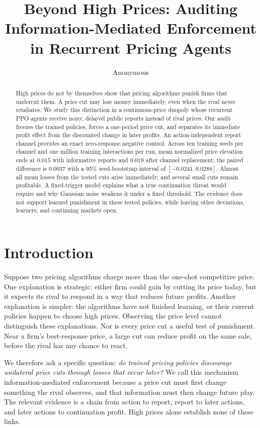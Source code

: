 \documentclass{article}
\title{Beyond High Prices: Auditing Information-Mediated Enforcement in Recurrent Pricing Agents}
\author{Anonymous}
\begin{document}
\maketitle

\begin{abstract}
High prices do not by themselves show that pricing algorithms punish firms that undercut them. A price cut may lose money immediately, even when the rival never retaliates. We study this distinction in a continuous-price duopoly whose recurrent PPO agents receive noisy, delayed public reports instead of rival prices. Our audit freezes the trained policies, forces a one-period price cut, and separates its immediate profit effect from the discounted change in later profits. An action-independent report channel provides an exact zero-response negative control. Across ten training seeds per channel and one million training interactions per run, mean normalized price elevation ends at $0.015$ with informative reports and $0.019$ after channel replacement; the paired difference is $0.0037$ with a 95\% seed-bootstrap interval of $[-0.0241,0.0288]$. Almost all mean losses from the tested cuts arise immediately, and several small cuts remain profitable. A fixed-trigger model explains what a true continuation threat would require and why Gaussian noise weakens it under a fixed threshold. The evidence does not support learned punishment in these tested policies, while leaving other deviations, learners, and continuing markets open.
\end{abstract}

\section{Introduction}

Suppose two pricing algorithms charge more than the one-shot competitive price. One explanation is strategic: either firm could gain by cutting its price today, but it expects its rival to respond in a way that reduces future profits. Another explanation is simpler: the algorithms have not finished learning, or their current policies happen to choose high prices. Observing the price level cannot distinguish these explanations. Nor is every price cut a useful test of punishment. Near a firm's best-response price, a large cut can reduce profit on the same sale, before the rival has any chance to react.

We therefore ask a specific question: \emph{do trained pricing policies discourage unilateral price cuts through losses that occur later?} We call this mechanism information-mediated enforcement because a price cut must first change something the rival observes, and that information must then change future play. The relevant evidence is a chain from action to report, report to later actions, and later actions to continuation profit. High prices alone establish none of these links.
\end{document}
